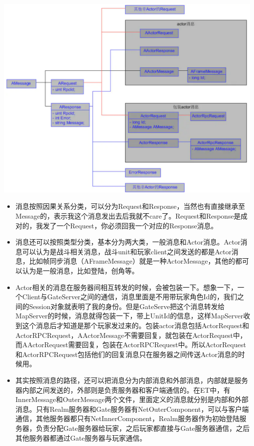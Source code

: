 \documentclass[9pt, b5paper]{article}
\begin{document}
\includegraphics[width=.9\linewidth]{./pic/readme_20230127_113555.png}
\begin{itemize}
\item 消息按照因果关系分类，可以分为Request和Response，当然也有直接继承至Message的，表示我这个消息发出去后我就不care了。Request和Response是成对的，我发了一个Request，你必须回我一个对应的Response消息。
\item 消息还可以按照类型分类，基本分为两大类，一般消息和Actor消息。Actor消息可以认为是战斗相关消息，战斗unit和玩家client之间发送的都是Actor消息，比如帧同步消息（AFrameMessage）就是一种ActorMessage，其他的都可以认为是一般消息，比如登陆，创角等。
\item Actor相关的消息在服务器间相互转发的时候，会被包装一下。想象一下，一个Client与GateServer之间的通信，消息里面是不用带玩家角色Id的，我们之间的Session对象就表明了我的身份。但是GateServe把这个消息转发给MapServer的时候，消息就得包装一下，带上UnitId的信息，这样MapServer收到这个消息后才知道是那个玩家发过来的。包装actor消息包括ActorRequest和ActorRPCRequest，AActorMessage不需要回复，就包装在ActorRequest中，而AActorRequest需要回复，包装在ActorRPCRequest中。所以ActorRequest和ActorRPCRequest包括他们的回复消息只在服务器之间传送Actor消息的时候用。
\item 其实按照消息的路径，还可以把消息分为内部消息和外部消息，内部就是服务器内部之间发送的，外部则是负责服务器和客户端通信的。在ET中，有InnerMessage和OuterMessage两个文件，里面定义的消息就分别是内部和外部消息。只有Realm服务器和Gate服务器有NetOuterComponent，可以与客户端通信，其他服务器都只有NetInnerComponent，Realm服务器作为初始登陆服务器，负责分配Gate服务器给玩家，之后玩家都直接与Gate服务器通信，之后其他服务器都通过Gate服务器与玩家通信。
\end{itemize}
\end{document}
